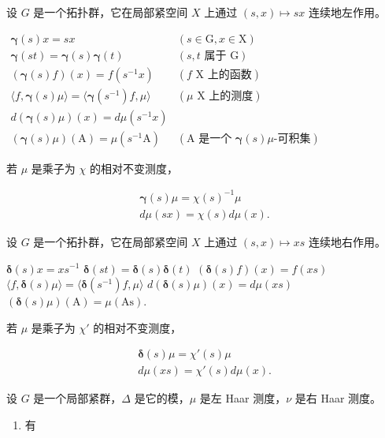 设 \(G\) 是一个拓扑群，它在局部紧空间 \(X\) 上通过 \((s, x) \mapsto sx\) 连续地左作用。

\(\begin{array}{ll}\pmb {\gamma}(s)x = sx & (s\in \mathrm{G},x\in \mathrm{X})\\ \pmb {\gamma}(st) = \pmb {\gamma}(s)\pmb {\gamma}(t) & (s,t\text{ 属于 G})\\ (\pmb {\gamma}(s)f)(x) = f(s^{-1}x) & (f\text{ X 上的函数})\\ \langle f,\pmb {\gamma}(s)\mu \rangle = \langle \pmb {\gamma}(s^{-1})f,\mu \rangle & (\mu \text{ X 上的测度})\\ d(\pmb {\gamma}(s)\mu)(x) = d\mu (s^{-1}x)\\ (\pmb {\gamma}(s)\mu)(\mathrm{A}) = \mu (s^{-1}\mathrm{A}) & (\mathrm{A}\text{ 是一个 }\pmb {\gamma}(s)\mu \text{-可积集}) \end{array}\)

若 \(\mu\) 是乘子为 \(\chi\) 的相对不变测度，

\[
\begin{array}{l} \pmb {\gamma} (s) \mu = \chi (s) ^ {- 1} \mu \\ d \mu (s x) = \chi (s) d \mu (x). \end{array}
\]

设 \(G\) 是一个拓扑群，它在局部紧空间 \(X\) 上通过 \((s, x) \mapsto xs\) 连续地右作用。

\(\pmb {\delta}(s)x = xs^{-1}\) \(\pmb {\delta}(st) = \pmb {\delta}(s)\pmb {\delta}(t)\) \((\pmb {\delta}(s)f)(x) = f(xs)\) \(\langle f,\pmb {\delta}(s)\mu \rangle = \langle \pmb {\delta}(s^{-1})f,\mu \rangle\) \(d(\pmb {\delta}(s)\mu)(x) = d\mu (xs)\) \((\pmb {\delta}(s)\mu)(\mathrm{A}) = \mu (\mathrm{As}).\)

若 \(\mu\) 是乘子为 \(\chi'\) 的相对不变测度，

\[
\begin{array}{l} \pmb {\delta} (s) \mu = \chi' (s) \mu \\ d \mu (x s) = \chi' (s) d \mu (x). \end{array}
\]


设 \(G\) 是一个局部紧群，\(\Delta\) 是它的模，\(\mu\) 是左 Haar 测度，\(\nu\) 是右 Haar 测度。

\begin{enumerate}
\def\labelenumi{\arabic{enumi})}
\tightlist
\item
  有
\end{enumerate}

